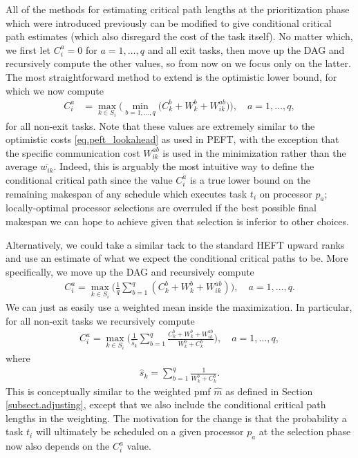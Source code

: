 \documentclass[12pt]{article}
\begin{document}
All of the methods for estimating critical path lengths at the prioritization phase which were introduced previously can be modified to give conditional critical path estimates (which also disregard the cost of the task itself). No matter which, we first let $C_i^a = 0$ for $a = 1, \dots, q$ and all exit tasks, then move up the DAG and recursively compute the other values, so from now on we focus only on the latter. The most straightforward method to extend is the optimistic lower bound, for which we now compute 
\begin{align}
C_i^a &= \max_{k \in S_i} \bigg( \min_{b = 1, \dots, q} \big( C_k^b + W_k^b + W_{ik}^{ab} \big)  \bigg), \quad a = 1, \dots, q, \label{eq.cia_min} 
\end{align}
for all non-exit tasks. Note that these values are extremely similar to the optimistic costs \eqref{eq.peft_lookahead} as used in PEFT, with the exception that the specific communication cost $W_{ik}^{ab}$ is used in the minimization rather than the average $\overline{w_{ik}}$. Indeed, this is arguably the most intuitive way to define the conditional critical path since the value $C_i^a$ is a true lower bound on the remaining makespan of any schedule which executes task $t_i$ on processor $p_a$; locally-optimal processor selections are overruled if the best possible final makespan we can hope to achieve given that selection is inferior to other choices.          

Alternatively, we could take a similar tack to the standard HEFT upward ranks and use an estimate of what we expect the conditional critical paths to be. More specifically, we move up the DAG and recursively compute 
\begin{align}
C_i^a = \max_{k \in S_i} \bigg( \frac{1}{q} \sum_{b = 1}^{q} (C_k^b + W_k^b + W_{ik}^{ab}) \bigg), \quad a = 1, \dots, q. \label{eq.cia_mean} 
\end{align} 
We can just as easily use a weighted mean inside the maximization. In particular, for all non-exit tasks we recursively compute
\begin{align}
C_i^a = \max_{k \in S_i} \bigg( \frac{1}{\hat{s}_k} \sum_{b = 1}^{q} \frac{C_k^b + W_k^b + W_{ik}^{ab}}{W_k^b + C_k^b} \bigg), \quad a = 1, \dots, q, \label{eq.cia_weighted} 
\end{align}
where
\begin{align}
\hat{s}_k = \sum_{b = 1}^{q} \frac{1}{W_k^b + C_k^b}. \label{eq.s_hat}
\end{align} 
This is conceptually similar to the weighted pmf $\hat{m}$ as defined in Section \ref{subsect.adjusting}, except that we also include the conditional critical path lengths in the weighting. The motivation for the change is that the probability a task $t_i$ will ultimately be scheduled on a given processor $p_a$ at the selection phase now also depends on the $C_i^a$ value.  
\end{document}
